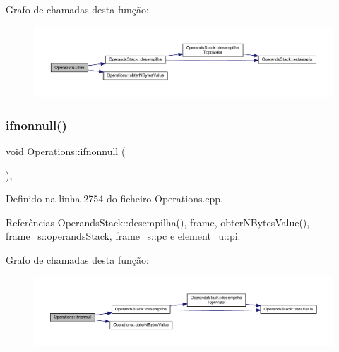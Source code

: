 Grafo de chamadas desta função\+:
\nopagebreak
\begin{figure}[H]
\begin{center}
\leavevmode
\includegraphics[width=350pt]{classOperations_aaadc2a6aaf1d3be06e918930622dad29_cgraph}
\end{center}
\end{figure}
\mbox{\label{classOperations_a00af7ab198690f5d3e6c7f2b2d374194}} 
\subsubsection{\texorpdfstring{ifnonnull()}{ifnonnull()}}
{\footnotesize\ttfamily void Operations\+::ifnonnull (\begin{DoxyParamCaption}{ }\end{DoxyParamCaption})\hspace{0.3cm}{\ttfamily [static]}, {\ttfamily [private]}}



Definido na linha 2754 do ficheiro Operations.\+cpp.



Referências Operands\+Stack\+::desempilha(), frame, obter\+N\+Bytes\+Value(), frame\+\_\+s\+::operands\+Stack, frame\+\_\+s\+::pc e element\+\_\+u\+::pi.

Grafo de chamadas desta função\+:
\nopagebreak
\begin{figure}[H]
\begin{center}
\leavevmode
\includegraphics[width=350pt]{classOperations_a00af7ab198690f5d3e6c7f2b2d374194_cgraph}
\end{center}
\end{figure}
\mbox{\label{classOperations_a030f5995f8f357254e543d0cbce2d189}} 
